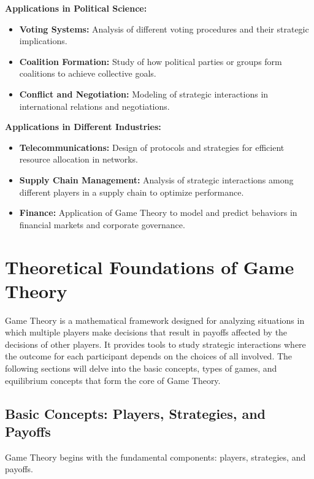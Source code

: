 \documentclass[12pt]{book} %
\begin{document}
\textbf{Applications in Political Science:}

\begin{itemize}
    \item \textbf{Voting Systems:} Analysis of different voting procedures and their strategic implications.
    \item \textbf{Coalition Formation:} Study of how political parties or groups form coalitions to achieve collective goals.
    \item \textbf{Conflict and Negotiation:} Modeling of strategic interactions in international relations and negotiations.
\end{itemize}

\textbf{Applications in Different Industries:}

\begin{itemize}
    \item \textbf{Telecommunications:} Design of protocols and strategies for efficient resource allocation in networks.
    \item \textbf{Supply Chain Management:} Analysis of strategic interactions among different players in a supply chain to optimize performance.
    \item \textbf{Finance:} Application of Game Theory to model and predict behaviors in financial markets and corporate governance.
\end{itemize}


\section{Theoretical Foundations of Game Theory}

Game Theory is a mathematical framework designed for analyzing situations in which multiple players make decisions that result in payoffs affected by the decisions of other players. It provides tools to study strategic interactions where the outcome for each participant depends on the choices of all involved. The following sections will delve into the basic concepts, types of games, and equilibrium concepts that form the core of Game Theory.

\subsection{Basic Concepts: Players, Strategies, and Payoffs}

Game Theory begins with the fundamental components: players, strategies, and payoffs.
\end{document}
